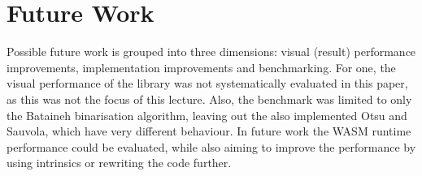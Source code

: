 \documentclass[sigconf]{acmart}
\begin{document}
\section{Future Work}
\label{sec:future-work}

Possible future work is grouped into three dimensions: visual (result) performance improvements, implementation improvements and benchmarking. For one, the visual performance of the library was not systematically evaluated in this paper, as this was not the focus of this lecture. Also, the benchmark was limited to only the Bataineh binarisation algorithm, leaving out the also implemented Otsu and Sauvola, which have very different behaviour. In future work the WASM runtime performance could be evaluated, while also aiming to improve the performance by using intrinsics or rewriting the code further.




\end{document}
